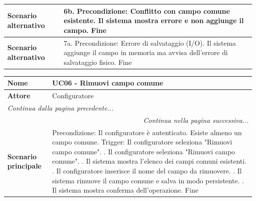 \documentclass[12pt, a4paper, oneside]{report}
\begin{document}
\begin{tabularx}{\textwidth}{|l|X|}
    \textbf{Scenario alternativo} & 
    6b. Precondizione: Conflitto con campo comune esistente. \newline
    Il sistema mostra errore e non aggiunge il campo. \newline
    Fine \\ \hline

    \textbf{Scenario alternativo} & 
    7a. Precondizione: Errore di salvataggio (I/O). \newline
    Il sistema aggiunge il campo in memoria ma avvisa dell'errore di salvataggio fisico. \newline
    Fine \\ \hline
\end{tabularx}

\renewcommand{\arraystretch}{1.4} 

\begin{tabularx}{\textwidth}{|l|X|}
    \hline
    \textbf{Nome}               & \textbf{UC06 - Rimuovi campo comune} \\ \hline
    \textbf{Attore}             & Configuratore \\ \hline
    \endfirsthead 

    \hline
    \multicolumn{2}{|l|}{\textit{Continua dalla pagina precedente...}} \\ \hline
    \endhead 

    \hline
    \multicolumn{2}{|r|}{\textit{Continua nella pagina successiva...}} \\ \hline
    \endfoot 

    \hline
    \endlastfoot

    \textbf{Scenario principale} & 
    Precondizione: Il configuratore è autenticato. Esiste almeno un campo comune. \newline
    Trigger: Il configuratore seleziona "Rimuovi campo comune". \newline
    1. Il configuratore seleziona "Rimuovi campo comune". \newline
    2. Il sistema mostra l'elenco dei campi comuni esistenti. \newline
    3. Il configuratore inserisce il nome del campo da rimuovere. \newline
    4. Il sistema rimuove il campo comune e salva in modo persistente. \newline
    5. Il sistema mostra conferma dell'operazione. \newline
    Fine \\ \hline
    

\end{tabularx}
\end{document}
